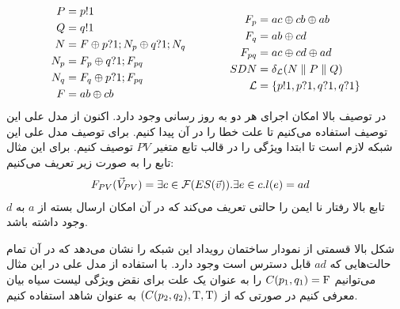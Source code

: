 \begin{equation*}
    \begin{aligned}[c]
        P   & = p!1                             \\
        Q   & = q!1                             \\
        N   & = F \oplus p?1;N_p \oplus q?1;N_q \\
        N_p & = F_p \oplus q?1;F_{pq}           \\
        N_q & = F_q \oplus p?1;F_{pq}           \\
        F   & = ab \oplus cb                    \\
    \end{aligned}
    \qquad\qquad
    \begin{aligned}[c]
        F_p         & = a c \oplus cb \oplus ab \\
        F_q         & = ab \oplus cd            \\
        F_{pq}      & = ac \oplus cd \oplus ad  \\
        SDN         & = \delta_{\mathcal{L}} (N
        \parallel P \parallel Q)                \\
        \mathcal{L} & = \{p!1,p?1,q?1,q?1\}     \\
    \end{aligned}
\end{equation*}
در توصیف بالا امکان اجرای هر دو به روز رسانی وجود دارد.
اکنون از مدل علی این توصیف استفاده می‌کنیم تا علت خطا را در آن پیدا کنیم.
برای توصیف مدل علی این شبکه لازم است تا ابتدا ویژگی را در قالب تابع متغیر
$PV$
توصیف کنیم.
برای این مثال تابع را به صورت زیر تعریف می‌کنیم:
\begin{align*}
    F_{PV}(\vec V_{PV}) & = \exists c \in \mathcal{F}(ES(\vec v)). \exists e \in c. l(e) = ad
\end{align*}
تابع بالا رفتار نا ایمن را حالتی تعریف می‌کند که در آن امکان ارسال بسته از 
$a$
به 
$d$
وجود داشته باشد.

\begin{center}
\end{center}

شکل بالا قسمتی از نمودار ساختمان رویداد این شبکه را نشان می‌دهد که در آن تمام حالت‌هایی که 
$ad$
قابل دسترس است وجود دارد.
با استفاده از مدل علی در این مثال می‌توانیم 
$C(p_1,q_1) = \mathrm{F}$
را به عنوان یک علت برای نقض ویژگی لیست سیاه بیان معرفی کنیم در صورتی که از 
$(C(p_2,q_2),\mathrm{T},\mathrm{T})$
به عنوان شاهد استفاده کنیم.
